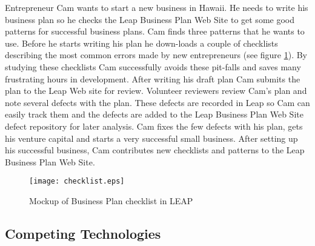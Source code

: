 Entrepreneur Cam wants to start a new business in Hawaii.  He needs to
write his business plan so he checks the Leap Business Plan Web Site to get
some good patterns for successful business plans.  Cam finds three patterns
that he wants to use.  Before he starts writing his plan he down-loads a
couple of checklists describing the most common errors made by new
entrepreneurs (see figure \ref{fig:checklist}).  By studying these
checklists Cam successfully avoids these pit-falls and saves many
frustrating hours in development.  After writing his draft plan Cam submits
the plan to the Leap Web site for review.  Volunteer reviewers review Cam's
plan and note several defects with the plan.  These defects are recorded in
Leap so Cam can easily track them and the defects are added to the Leap
Business Plan Web Site defect repository for later analysis.  Cam fixes the
few defects with his plan, gets his venture capital and starts a very
successful small business.  After setting up his successful business, Cam
contributes new checklists and patterns to the Leap Business Plan Web Site.

\begin{figure}[htb]
  \centering
  \texttt{[image: checklist.eps]}
  \caption{Mockup of Business Plan checklist in LEAP}
  \label{fig:checklist}
\end{figure}



\subsection{Competing Technologies}


